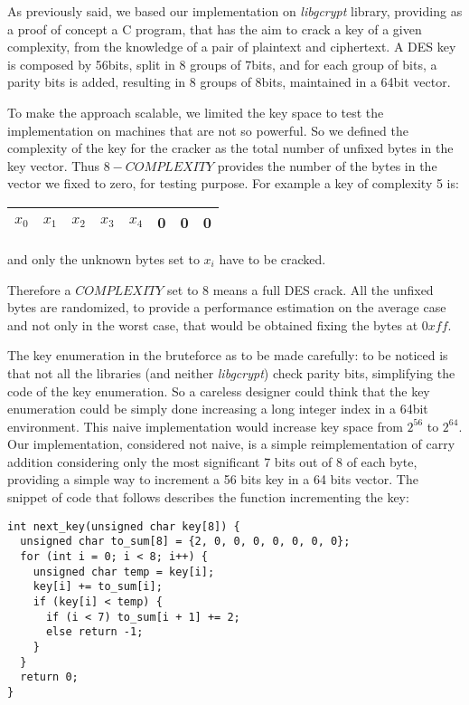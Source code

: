 \documentclass[11pt]{article}
\begin{document}
  As previously said, we based our implementation on \textit{libgcrypt} \cite{libgcrypt} library, providing as a proof of concept a C program, that has the aim to crack a key of a given complexity, from the knowledge of a pair of plaintext and ciphertext. A DES key is composed by 56bits, split in 8 groups of 7bits, and for each group of bits, a parity bits is added, resulting in 8 groups of 8bits, maintained in a 64bit vector.

  To make the approach scalable, we limited the key space to test the implementation on machines that are not so powerful. So we defined the complexity of the key for the cracker as the total number of unfixed bytes in the key vector. Thus $8 - COMPLEXITY$ provides the number of the bytes in the vector we fixed to zero, for testing purpose.
  For example a key of complexity 5 is:
  \begin{center}
    \begin{tabular}{ | c | c | c | c | c | c | c | c |}
      \hline
      $x_0$ & $x_1$ & $x_2$ & $x_3$ & $x_4$ & 0 & 0 & 0 \\
      \hline
    \end{tabular}
  \end{center}
  and only the unknown bytes set to $x_i$ have to be cracked.

  Therefore a $COMPLEXITY$ set to 8 means a full DES crack. All the unfixed bytes are randomized, to provide a performance estimation on the average case and not only in the worst case, that would be obtained fixing the bytes at $0xff$.

  The key enumeration in the bruteforce as to be made carefully: to be noticed is that not all the libraries (and neither \textit{libgcrypt}) check parity bits, simplifying the code of the key enumeration. So a careless designer could think that the key enumeration could be simply done increasing a long integer index in a 64bit environment. This naive implementation would increase key space from $2^{56}$ to $2^{64}$.
  Our implementation, considered not naive, is a simple reimplementation of carry addition considering only the most significant 7 bits out of 8 of each byte, providing a simple way to increment a 56 bits key in a 64 bits vector. The snippet of code that follows describes the function incrementing the key:
  \bigskip
  \bigskip
  \begin{verbatim}
int next_key(unsigned char key[8]) {
  unsigned char to_sum[8] = {2, 0, 0, 0, 0, 0, 0, 0};
  for (int i = 0; i < 8; i++) {
    unsigned char temp = key[i];
    key[i] += to_sum[i];
    if (key[i] < temp) {
      if (i < 7) to_sum[i + 1] += 2;
      else return -1;
    }
  }
  return 0;
}
  \end{verbatim}
\end{document}
